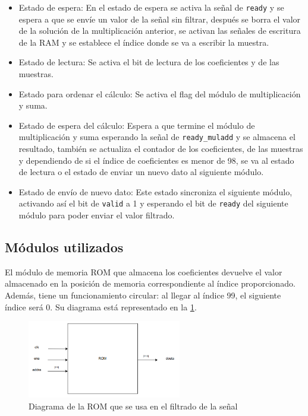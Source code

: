 \begin{itemize}
    \item Estado de espera: En el estado de espera se activa la señal de \texttt{ready} y se espera a que se envíe un valor de la señal sin filtrar, después se borra el valor de la solución de la multiplicación anterior, se activan las señales de escritura de la RAM y se establece el índice donde se va a escribir la muestra.
    \item Estado de lectura: Se activa el bit de lectura de los coeficientes y de las muestras.
    \item Estado para ordenar el cálculo: Se activa el flag del módulo de multiplicación y suma.
    \item Estado de espera del cálculo: Espera a que termine el módulo de multiplicación y suma esperando la señal de \texttt{ready\_muladd}
    y se almacena el resultado, también se actualiza el contador de los coeficientes, de las muestras y dependiendo de si el 
    índice de coeficientes es menor de 98, se va al estado de lectura o el estado de enviar un nuevo dato al siguiente módulo.
    \item Estado de envío de nuevo dato: Este estado sincroniza el siguiente módulo, activando así el bit de \texttt{valid} a 1 y esperando el bit
    de \texttt{ready} del siguiente módulo para poder enviar el valor filtrado.
\end{itemize}

\subsection{Módulos utilizados}
El módulo de memoria ROM que almacena los coeficientes devuelve el valor almacenado en la posición de memoria correspondiente al índice proporcionado. Además, tiene un funcionamiento circular: al llegar al índice 99, el siguiente índice será 0. Su diagrama está representado en la \cref{fig:diagramamoduloROM}.

\begin{figure}[h!]
    \centering
    \includegraphics[width=0.6\textwidth]{./Images/img_implementacion_hw/diagramamoduloROM.png}
    \caption{Diagrama de la ROM que se usa en el filtrado de la señal}
    \label{fig:diagramamoduloROM}
\end{figure} 
\FloatBarrier


